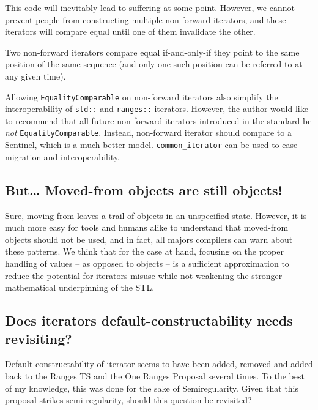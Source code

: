 \documentclass{wg21}
\begin{document}
This code will inevitably lead to suffering at some point. However, we
cannot prevent people from constructing multiple non-forward iterators,
and these iterators will compare equal until one of them invalidate the
other.

Two non-forward iterators compare equal if-and-only-if they point to the
same position of the same sequence (and only one such position can be
referred to at any given time).

Allowing \texttt{EqualityComparable} on non-forward iterators also
simplify the interoperability of \texttt{std::} and \texttt{ranges::}
iterators. However, the author would like to recommend that all future
non-forward iterators introduced in the standard be \emph{not}
\texttt{EqualityComparable}. Instead, non-forward iterator should
compare to a Sentinel, which is a much better model.
\texttt{common\_iterator} can be used to ease migration and
interoperability.

\hypertarget{but-moved-from-objects-are-still-objects}{%
	\subsection{But\ldots{} Moved-from objects are still
		objects!}\label{but-moved-from-objects-are-still-objects}}

Sure, moving-from leaves a trail of objects in an unspecified state.
However, it is much more easy for tools and humans alike to understand
that moved-from objects should not be used, and in fact, all majors
compilers can warn about these patterns. We think that for the case at
hand, focusing on the proper handling of values -- as opposed to objects
-- is a sufficient approximation to reduce the potential for iterators
misuse while not weakening the stronger mathematical underpinning of the
STL.

\hypertarget{does-iterators-default-constructability-needs-revisiting}{%
	\subsection{Does iterators default-constructability needs
		revisiting?}\label{does-iterators-default-constructability-needs-revisiting}}

Default-constructability of iterator seems to have been added, removed
and added back to the Ranges TS and the One Ranges Proposal several
times. To the best of my knowledge, this was done for the sake of
Semiregularity. Given that this proposal strikes semi-regularity, should
this question be revisited?
\end{document}
